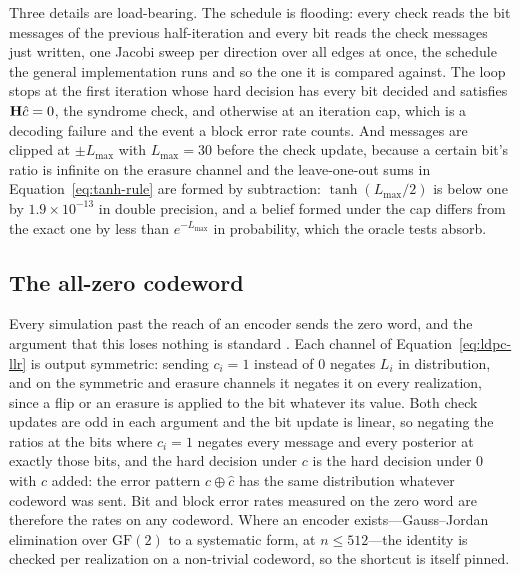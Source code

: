 \documentclass[11pt,a4paper]{article}
\begin{document}
Three details are load-bearing. The schedule is flooding: every check reads the
bit messages of the previous half-iteration and every bit reads the check
messages just written, one Jacobi sweep per direction over all edges at once,
the schedule the general implementation runs and so the one it is compared
against. The loop stops at
the first iteration whose hard decision has every bit decided and satisfies
$\mathbf{H} \hat c = 0$, the syndrome check, and otherwise at an iteration
cap, which is a decoding failure and the event a block error rate counts. And
messages are clipped at $\pm L_{\max}$ with $L_{\max} = 30$ before the check
update, because a certain bit's ratio is infinite on the erasure channel and
the leave-one-out sums in Equation~\ref{eq:tanh-rule} are formed by
subtraction: $\tanh(L_{\max}/2)$ is below one by $1.9 \times 10^{-13}$ in
double precision, and a belief formed under the cap differs from the exact
one by less than $e^{-L_{\max}}$ in probability, which the oracle tests
absorb.

\subsection{The all-zero codeword}
Every simulation past the reach of an encoder sends the zero word, and the
argument that this loses nothing is standard \citep[Sec.~4.1]{richardson2008}.
Each channel of Equation~\ref{eq:ldpc-llr} is output symmetric: sending
$c_i = 1$ instead of $0$ negates $L_i$ in distribution, and on the symmetric
and erasure channels it negates it on every realization, since a flip or an
erasure is applied to the bit whatever its value. Both check updates are odd
in each argument and the bit update is linear, so negating the ratios at the
bits where $c_i = 1$ negates every message and every posterior at exactly
those bits, and the hard decision under $c$ is the hard decision under $0$
with $c$ added: the error pattern $c \oplus \hat c$ has the same
distribution whatever codeword was sent. Bit and block error rates measured
on the zero word are therefore the rates on any codeword. Where an encoder
exists---Gauss--Jordan elimination over $\mathrm{GF}(2)$ to a systematic
form, at $n \le 512$---the identity is checked per realization on a
non-trivial codeword, so the shortcut is itself pinned.
\end{document}
